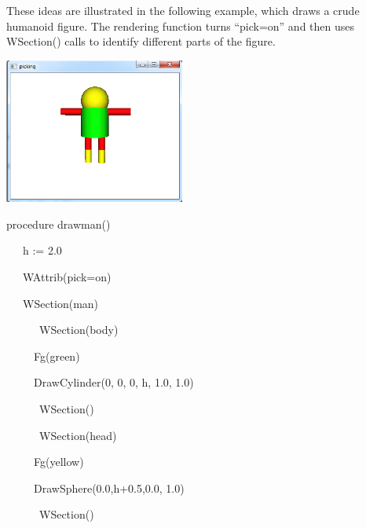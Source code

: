 \documentclass[letterpaper]{article}
\begin{document}
\bigskip

{
These ideas are illustrated in the following example, which draws a crude humanoid figure. The rendering function turns
\textsf{{}``pick=on''} and then uses \textsf{WSection()} calls to identify different parts of the figure.}



\begin{center}
\includegraphics[width=2.3402in,height=1.8799in]{utr9/utr9-img034.png}
\end{center}

\bigskip


\bigskip

{\sffamily
procedure drawman()}

{\sffamily
\ \ \ h := 2.0}

{\sffamily
\ \ \ WAttrib({\textquotedbl}pick=on{\textquotedbl})}

{\sffamily
\ \ \ WSection({\textquotedbl}man{\textquotedbl})}

{\sffamily
\ \ \ \ \ \ WSection({\textquotedbl}body{\textquotedbl})}

{\sffamily
\ \ \ \ \  Fg({\textquotedbl}green{\textquotedbl})}

{\sffamily
\ \ \ \ \  DrawCylinder(0, 0, 0, h, 1.0, 1.0)}

{\sffamily
\ \ \ \ \ \ WSection()}

{\sffamily
\ \ \ \ \ \ WSection({\textquotedbl}head{\textquotedbl})}

{\sffamily
\ \ \ \ \  Fg({\textquotedbl}yellow{\textquotedbl})}

{\sffamily
\ \ \ \ \  DrawSphere(0.0,h+0.5,0.0, 1.0)}

{\sffamily
\ \ \ \ \ \ WSection()}
\end{document}
